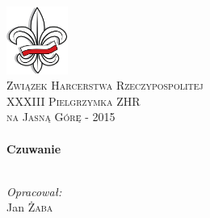 \begin{titlepage}
	\begin{center}

	\includegraphics[width=0.15\textwidth]{./files/lilijka}
	\\[1cm]
	
	\textsc{\LARGE Związek Harcerstwa Rzeczypospolitej}\\[1.0cm]
	\textsc{\Large XXXIII Pielgrzymka ZHR }\\[1.0cm]
	\textsc{na Jasną Górę - 2015}\\[1.0cm]
	
	\HRule \\[0.4cm]
	{\huge \bfseries Czuwanie \\[0.4cm] }
	\HRule \\[1.5cm]
	
	
	\vfill
	
	
	\noindent
	
	\large
	\emph{Opracował:}\\
	Jan \textsc{Żaba}\\
	
	
	
	
	\end{center}
\end{titlepage}